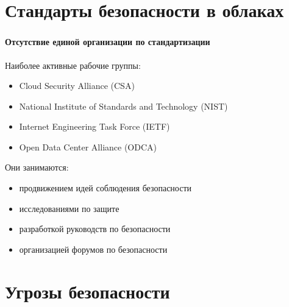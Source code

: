 
\frame[plain]{\titlepage} %


\section{Стандарты безопасности в облаках}

\begin{frame}
\frametitle{\insertsection}
\framesubtitle{Отсутствие единой организации по стандартизации}

Наиболее активные рабочие группы:
\begin{itemize}
    \item Cloud Security Alliance (CSA)
    \item National Institute of Standards and Technology (NIST)
    \item Internet Engineering Task Force (IETF)
    \item Open Data Center Alliance (ODCA)
\end{itemize}

\vspace{\baselineskip}

Они занимаются:
\begin{itemize}
    \item продвижением идей соблюдения безопасности
    \item исследованиями по защите
    \item разработкой руководств по безопасности
    \item организацией форумов по безопасности
\end{itemize}
\end{frame}


\section{Угрозы безопасности}

